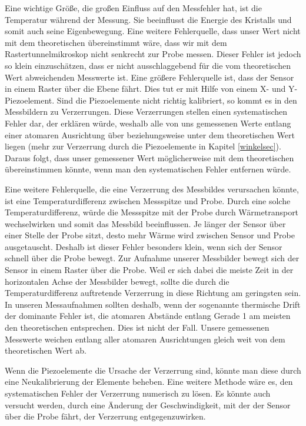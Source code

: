 \documentclass[10pt,a4paper]{article}
\begin{document}
Eine wichtige Größe, die großen Einfluss auf den Messfehler hat, ist die Temperatur während der Messung. Sie beeinflusst die Energie des Kristalls und somit auch seine Eigenbewegung. Eine weitere Fehlerquelle, dass unser Wert nicht mit dem theoretischen übereinstimmt wäre, dass wir mit dem Rastertunnelmikroskop nicht senkrecht zur Probe messen. Dieser Fehler ist jedoch so klein einzuschätzen, dass er nicht ausschlaggebend für die vom theoretischen Wert abweichenden Messwerte ist. Eine größere Fehlerquelle ist, dass der Sensor in einem Raster über die Ebene fährt. Dies tut er mit Hilfe von einem X- und Y-Piezoelement. Sind die Piezoelemente nicht richtig kalibriert, so kommt es in den Messbildern zu Verzerrungen. Diese Verzerrungen stellen einen systematischen Fehler dar, der erklären würde, weshalb alle von uns gemessenen Werte entlang einer atomaren Ausrichtung über beziehungsweise unter dem theoretischen Wert liegen (mehr zur Verzerrung durch die Piezoelemente in Kapitel \ref{winkelsec}). Daraus folgt, dass unser gemessener Wert möglicherweise mit dem theoretischen übereinstimmen könnte, wenn man den systematischen Fehler entfernen würde.  

Eine weitere Fehlerquelle, die eine Verzerrung des Messbildes verursachen könnte, ist eine Temperaturdifferenz zwischen Messspitze und Probe. Durch eine solche Temperaturdifferenz, würde die Messspitze mit der Probe durch Wärmetransport wechselwirken und somit das Messbild beeinflussen. Je länger der Sensor über einer Stelle der Probe sitzt, desto mehr Wärme wird zwischen Sensor und Probe ausgetauscht. Deshalb ist dieser Fehler besonders klein, wenn sich der Sensor schnell über die Probe bewegt. Zur Aufnahme unserer Messbilder bewegt sich der Sensor in einem Raster über die Probe. Weil er sich dabei die meiste Zeit in der horizontalen Achse der Messbilder bewegt, sollte die durch die Temperaturdifferenz auftretende Verzerrung in diese Richtung am geringsten sein. In unseren Messaufnahmen sollten deshalb, wenn der sogenannte thermische Drift der dominante Fehler ist, die atomaren Abstände entlang Gerade 1 am meisten den theoretischen entsprechen. Dies ist nicht der Fall. Unsere gemessenen Messwerte weichen entlang aller atomaren Ausrichtungen gleich weit von dem theoretischen Wert ab.

Wenn die Piezoelemente die Ursache der Verzerrung sind, könnte man diese durch eine Neukalibrierung der Elemente beheben. Eine weitere Methode wäre es, den systematischen Fehler der Verzerrung numerisch zu lösen. Es könnte auch versucht werden, durch eine Änderung der Geschwindigkeit, mit der der Sensor über die Probe fährt, der Verzerrung entgegenzuwirken.
\end{document}
